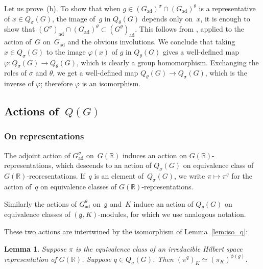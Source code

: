 \documentclass[10pt,leqno]{article}
\newtheorem{lemma}[equation]{Lemma}
\numberwithin{equation}{section}
\newcommand{\ad}{\mathrm{ad}}
\newcommand{\Gad}{G_\mathrm{ad}}
\newcommand{\R}{\mathbb R}
\newcommand{\g}{\mathfrak g}
\begin{document}
Let us prove~(b). To show that when $g\in (\Gad)^\sigma \cap (\Gad)^\theta$ is a representative of $x \in Q_{\sigma}(G)$,  the image of~$g$ in  $Q_\theta(G)$ depends only on~$x$, it is enough to show that  $(G^\sigma)_\ad \cap (\Gad)^\theta \subset (G^\theta)_{\ad}$. This follows from \cite[Proposition 5.4]{galois}, applied to the action of~$G$ on~$\Gad$ and the obvious involutions. We conclude that taking $x \in Q_{\sigma}(G)$ to the image $\varphi(x)$ of $g$ in $Q_{\theta}(G)$ gives a well-defined map $\varphi\colon Q_{\sigma}(G)\to Q_{\theta}(G)$, which is clearly a group homomorphism. Exchanging the roles of $\sigma$ and $\theta$, we get a well-defined map $Q_{\theta}(G) \to Q_{\sigma}(G)$, which is the inverse of $\varphi$; therefore $\varphi$ is an isomorphism.

%


\subsection{Actions of~$Q(G)$}


\subsubsection*{On representations} 



The adjoint action of $\Gad^\sigma$ on~$G(\R)$ induces an action on $G(\R)$-representations, which descends to an action of  $Q_\sigma(G)$ on equivalence class of $G(\R)$-reoresentations. If~$q$ is an element of~$Q_\sigma(G)$, we write $\pi \mapsto \pi^q$ for the action of~$q$ on equivalence classes of $G(\R)$-representations. 

Similarly the actions of $\Gad^\theta$ on~$\g$ and~$K$ induce an action of $Q_\theta(G)$ on equivalence classes of $(\g,K)$-modules, for which we use analogous notation.

These two actions are intertwined by the isomorphism of Lemma~\ref{lem:iso_q}:

\begin{lemma}\label{lem:action_q}
Suppose $\pi$ is the equivalence class of an irreducible Hilbert space representation of $G(\R)$. 
Suppose $q\in Q_\sigma(G)$. 
Then $(\pi^q)_K\simeq (\pi_K)^{\phi(g)}$.
\end{lemma}
\end{document}

